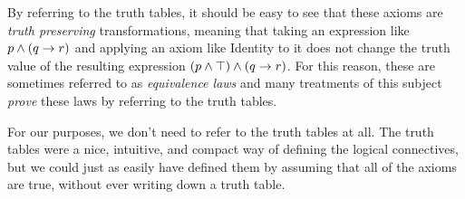 \begin{definition}
    By referring to the truth tables, it should be easy to see that these axioms are \emph{truth preserving} transformations,
    meaning that taking an expression like $p \wedge (q \rightarrow r)$ and applying an axiom like Identity to it
    does not change the truth value of the resulting expression $(p \wedge \top) \wedge (q \rightarrow r)$.
    For this reason, these are sometimes referred to as \emph{equivalence laws} and many treatments of this subject
    \emph{prove} these laws by referring to the truth tables.

    For our purposes, we don't need to refer to the truth tables at all.
    The truth tables were a nice, intuitive, and compact way of defining the logical connectives,
    but we could just as easily have defined them by assuming that all of the axioms are true,
    without ever writing down a truth table.
\end{definition}

